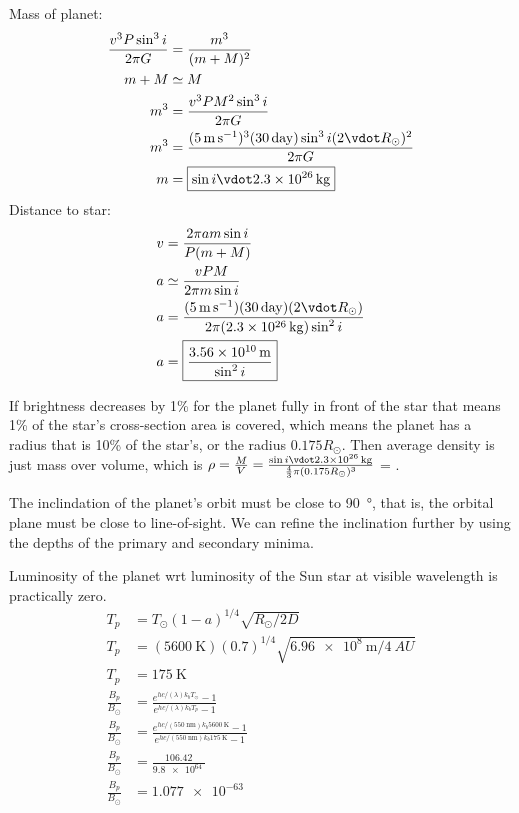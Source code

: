\documentclass{homework}
\begin{document}
\maketitle


\question
Mass of planet:
\begin{align*}
    \frac{v^3 P \sin^3{i}}{2\pi G}	&=	\frac{m^3}{(m+M)^2}	\\
    m + M &\simeq M \\
    m^3 &= \frac{v^3 P M^2 \sin^3{i}}{2\pi G}  \\
    m^3 &= \frac{(\SI{5}{\metre\per\second})^3 (\SI{30}{day}) \sin^3{i} (2 \vdot R_\odot)^2}{2\pi G}  \\
    m   &=  \boxed{\sin{i} \vdot \SI{2.3e26}{\kilogram}}
\end{align*}
Distance to star:
\begin{align*}
    v   &=	\frac{2\pi a m \sin{i}}{P(m+M)}	\\
    a   &\simeq  \frac{vPM}{2\pi m \sin{i}}  \\
    a   &=  \frac{(\SI{5}{\metre\per\second})(\SI{30}{day})(2 \vdot R_\odot)}{2\pi (\SI{2.3e26}{\kilogram}) \sin^2{i}}  \\
    a   &=  \boxed{\frac{\SI{3.56e10}{\metre}}{\sin^2{i}}}
\end{align*}


\question
If brightness decreases by 1\% for the planet fully in front of the star that means 1\% of the star's cross-section area is covered, which means the planet has a radius that is 10\% of the star's, or the radius $0.175 R_\odot$. Then average density is just mass over volume, which is $\rho = \frac{M}{V} = \frac{\sin{i} \vdot \SI{2.3e26}{\kilogram}}{\frac{4}{3}\pi(0.175 R_\odot)^3}$ = .

The inclindation of the planet's orbit must be close to \SI{90}{\degree}, that is, the orbital plane must be close to line-of-sight. We can refine the inclination further by using the depths of the primary and secondary minima.


\newpage
\question
Luminosity of the planet wrt luminosity of the Sun star at visible wavelength is practically zero.
\begin{align*}
    T_p    &=	T_\odot (1-a)^{1/4} \sqrt{R_\odot / 2D}	\\
    T_p    &=	(\SI{5600}{\kelvin}) (0.7)^{1/4} \sqrt{\SI{6.96e8}{\metre} / \SI{4}{AU}}	\\
    T_p &=  \SI{175}{\kelvin}  \\
    \frac{B_p}{B_\odot} &=	\frac{e^{hc/(\lambda)k_b T_\odot}-1}{e^{hc/(\lambda)k_b T_p}-1}	\\
    \frac{B_p}{B_\odot} &=	\frac{e^{hc/(\SI{550}{\nano\metre})k_b \SI{5600}{\kelvin}}-1}{e^{hc/(\SI{550}{\nano\metre})k_b \SI{175}{\kelvin}}-1}	\\
    \frac{B_p}{B_\odot}    &=	\frac{106.42}{\SI{9.8e64}{}}	\\
    \frac{B_p}{B_\odot} &=  \boxed{\SI{1.077e-63}{}}
\end{align*}
\end{document}
